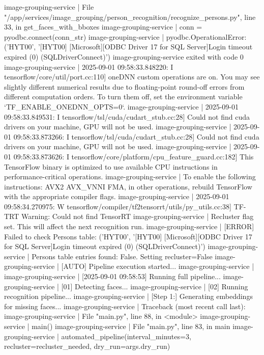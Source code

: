 image-grouping-service  |   File "/app/services/image_grouping/person_recognition/recognize_persons.py", line 33, in get_faces_with_bboxes
image-grouping-service  |     conn = pyodbc.connect(conn_str)
image-grouping-service  | pyodbc.OperationalError: ('HYT00', '[HYT00] [Microsoft][ODBC Driver 17 for SQL Server]Login timeout expired (0) (SQLDriverConnect)')
image-grouping-service exited with code 0
image-grouping-service  | 2025-09-01 09:58:33.848220: I tensorflow/core/util/port.cc:110] oneDNN custom operations are on. You may see slightly different numerical results due to floating-point round-off errors from different computation orders. To turn them off, set the environment variable `TF_ENABLE_ONEDNN_OPTS=0`.
image-grouping-service  | 2025-09-01 09:58:33.849531: I tensorflow/tsl/cuda/cudart_stub.cc:28] Could not find cuda drivers on your machine, GPU will not be used.
image-grouping-service  | 2025-09-01 09:58:33.873266: I tensorflow/tsl/cuda/cudart_stub.cc:28] Could not find cuda drivers on your machine, GPU will not be used.
image-grouping-service  | 2025-09-01 09:58:33.873626: I tensorflow/core/platform/cpu_feature_guard.cc:182] This TensorFlow binary is optimized to use available CPU instructions in performance-critical operations.
image-grouping-service  | To enable the following instructions: AVX2 AVX_VNNI FMA, in other operations, rebuild TensorFlow with the appropriate compiler flags.
image-grouping-service  | 2025-09-01 09:58:34.270975: W tensorflow/compiler/tf2tensorrt/utils/py_utils.cc:38] TF-TRT Warning: Could not find TensorRT
image-grouping-service  | Recluster flag set. This will affect the next recognition run.
image-grouping-service  | [ERROR] Failed to check Persons table: ('HYT00', '[HYT00] [Microsoft][ODBC Driver 17 for SQL Server]Login timeout expired (0) (SQLDriverConnect)')
image-grouping-service  | Persons table entries found: False. Setting recluster=False
image-grouping-service  | [AUTO] Pipeline execution started...
image-grouping-service  |
image-grouping-service  | [2025-09-01 09:58:53] Running full pipeline...
image-grouping-service  | [01] Detecting faces...
image-grouping-service  | [02] Running recognition pipeline...
image-grouping-service  | [Step 1:] Generating embeddings for missing faces...
image-grouping-service  | Traceback (most recent call last):
image-grouping-service  |   File "main.py", line 88, in <module>
image-grouping-service  |     main()
image-grouping-service  |   File "main.py", line 83, in main
image-grouping-service  |     automated_pipeline(interval_minutes=3, recluster=recluster_needed, dry_run=args.dry_run)
